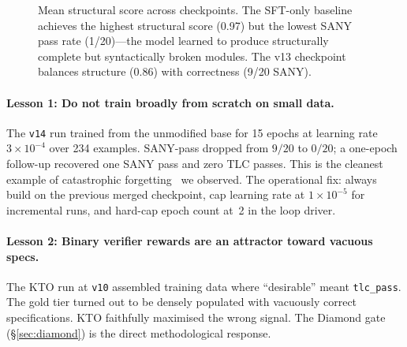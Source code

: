 \documentclass[11pt]{article}
\begin{document}
\begin{figure}[t]
\centering
{}
\caption{Mean structural score across checkpoints.  The SFT-only
baseline achieves the highest structural score (0.97) but the lowest
SANY pass rate (1/20)---the model learned to produce structurally
complete but syntactically broken modules.  The v13 checkpoint balances
structure (0.86) with correctness (9/20 SANY).}
\label{fig:structural}
\end{figure}

\paragraph{Lesson 1: Do not train broadly from scratch on small data.}
The \texttt{v14} run trained from the unmodified base for 15 epochs at
learning rate $3\!\times\!10^{-4}$ over 234 examples.  SANY-pass
dropped from $9/20$ to $0/20$; a one-epoch follow-up recovered one
SANY pass and zero TLC passes.  This is the cleanest example of
catastrophic forgetting~\cite{kirkpatrick2017ewc, lopez2017gem} we
observed.  The operational fix: always build on the previous merged
checkpoint, cap learning rate at $1\!\times\!10^{-5}$ for incremental
runs, and hard-cap epoch count at~2 in the loop driver.

\paragraph{Lesson 2: Binary verifier rewards are an attractor toward
vacuous specs.}  The KTO run at \texttt{v10} assembled training data
where ``desirable'' meant \texttt{tlc\_pass}.  The gold tier turned
out to be densely populated with vacuously correct specifications.
KTO faithfully maximised the wrong signal.  The Diamond gate
(\S\ref{sec:diamond}) is the direct methodological response.
\end{document}
